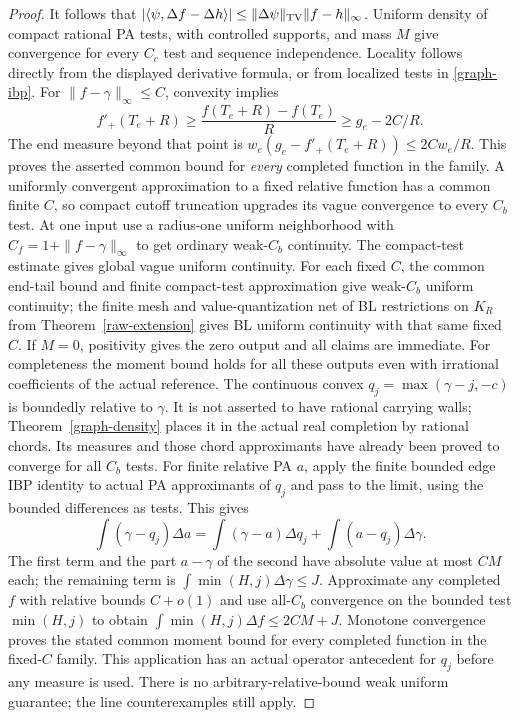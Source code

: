\begin{proof}
It follows that
$|\langle\psi,\Delta f-\Delta h\rangle|
\leq\|\Delta\psi\|_{\rm TV}\|f-h\|_\infty$.
Uniform density of compact rational PA tests, with controlled supports,
and mass $M$ give convergence for every $C_c$ test and sequence
independence. Locality follows directly from the displayed derivative
formula, or from localized tests in \eqref{graph-ibp}.
For $\|f-\gamma\|_\infty\leq C$, convexity implies
\[
 f'_+(T_e+R)\geq\frac{f(T_e+R)-f(T_e)}R
                         \geq g_e-2C/R.
\]
The end measure beyond that point is
$w_e(g_e-f'_+(T_e+R))\leq2Cw_e/R$.
This proves the asserted common bound for \emph{every} completed function
in the family. A uniformly convergent approximation to a fixed relative
function has a common finite $C$, so compact cutoff truncation upgrades
its vague convergence to every $C_b$ test. At one input use a radius-one
uniform neighborhood with $C_f=1+\|f-\gamma\|_\infty$ to get ordinary
weak-$C_b$ continuity. The compact-test estimate gives global vague
uniform continuity. For each fixed $C$, the common end-tail bound and
finite compact-test approximation give weak-$C_b$ uniform continuity;
the finite mesh and value-quantization net of BL restrictions on $K_R$
from Theorem~\ref{raw-extension} gives BL uniform continuity with
that same fixed $C$. If $M=0$, positivity gives the zero output and
all claims are immediate.
For completeness the moment bound holds for all these outputs even with
irrational coefficients of the actual reference. The continuous convex
$q_j=\max(\gamma-j,-c)$ is boundedly relative to $\gamma$.
It is not asserted to have rational carrying walls; Theorem~\ref{graph-density}
places it in the actual real completion by rational chords. Its measures
and those chord approximants have already been proved to converge for
all $C_b$ tests. For finite relative PA $a$, apply the finite bounded
edge IBP identity to actual PA approximants of $q_j$ and pass to the
limit, using the bounded differences as tests. This gives
\[
 \int(\gamma-q_j)\Delta a
 =\int(\gamma-a)\Delta q_j+\int(a-q_j)\Delta\gamma.
\]
The first term and the part $a-\gamma$ of the second have absolute
value at most $CM$ each; the remaining term is
$\int\min(H,j)\Delta\gamma\leq J$.
Approximate any completed $f$ with relative bounds $C+o(1)$ and use
all-$C_b$ convergence on the bounded test $\min(H,j)$ to obtain
$\int\min(H,j)\Delta f\leq2CM+J$. Monotone convergence proves
the stated common moment bound for every completed function in the
fixed-$C$ family. This application has an actual operator antecedent
for $q_j$ before any measure is used.
There is no arbitrary-relative-bound weak
uniform guarantee; the line counterexamples still apply.
\end{proof}

